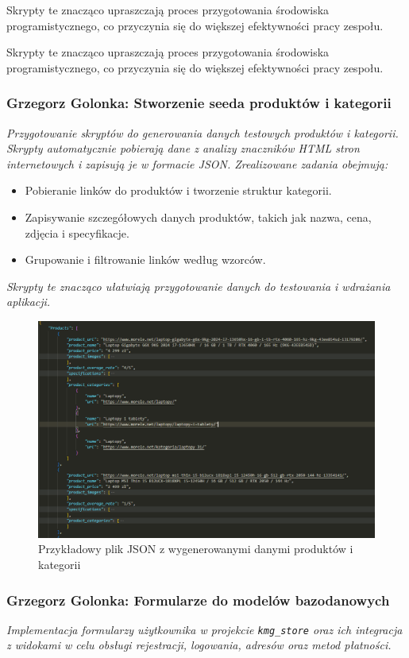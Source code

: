 \documentclass[12pt,a4paper,oneside]{article}
\theoremstyle{definition}
\numberwithin{equation}{section}
\begin{document}
Skrypty te znacząco upraszczają proces przygotowania środowiska programistycznego, co przyczynia się do większej efektywności pracy zespołu.


Skrypty te znacząco upraszczają proces przygotowania środowiska programistycznego, co przyczynia się do większej efektywności pracy zespołu. 
% 
% 
\subsubsection{Grzegorz Golonka: Stworzenie seeda produktów i kategorii}
\label{section:1.3.19}
\textit{
Przygotowanie skryptów do generowania danych testowych produktów i kategorii. Skrypty automatycznie pobierają dane z analizy znaczników HTML stron internetowych i zapisują je w formacie JSON. Zrealizowane zadania obejmują:
}
\begin{itemize}
    \item Pobieranie linków do produktów i tworzenie struktur kategorii.
    \item Zapisywanie szczegółowych danych produktów, takich jak nazwa, cena, zdjęcia i specyfikacje.
    \item Grupowanie i filtrowanie linków według wzorców.
\end{itemize}

\textit{
Skrypty te znacząco ułatwiają przygotowanie danych do testowania i wdrażania aplikacji.
}

\begin{figure}[H]
    \centering
    \includegraphics[width=0.9\columnwidth]{images/krzysztofBImages/products_seed.png}
    \caption{Przykładowy plik JSON z wygenerowanymi danymi produktów i kategorii}
\end{figure}
% 
% 
\subsubsection{Grzegorz Golonka: Formularze do modelów bazodanowych}
\label{section:1.3.21}
\textit{
Implementacja formularzy użytkownika w projekcie \texttt{kmg\_store} oraz ich integracja z widokami w celu obsługi rejestracji, logowania, adresów oraz metod płatności.
}
\end{document}
